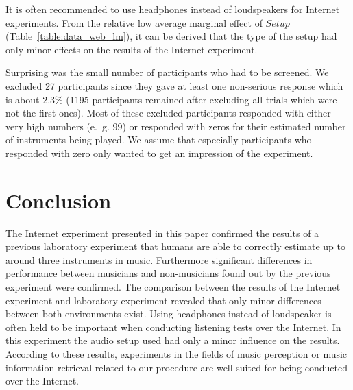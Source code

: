 It is often recommended to use headphones instead of loudspeakers for Internet experiments. From the relative low average marginal effect of $\textit{Setup}$ (Table~\ref{table:data_web_lm}), it can be derived that the type of the setup had only minor effects on the results of the Internet experiment.

Surprising was the small number of participants who had to be screened. We excluded 27 participants since they gave at least one non-serious response which is about 2.3\% (1195 participants remained after excluding all trials which were not the first ones). Most of these excluded participants responded with either very high numbers (e.~g. 99) or responded with zeros for their estimated number of instruments being played. We assume that especially participants who responded with zero only wanted to get an impression of the experiment.



\section{Conclusion}\label{sec:conclusion}
The Internet experiment presented in this paper confirmed the results of a previous laboratory experiment that humans are able to correctly estimate up to around three instruments in music. Furthermore significant differences in performance between musicians and non-musicians found out by the previous experiment were confirmed.
The comparison between the results of the Internet experiment and laboratory experiment revealed that only minor differences between both environments exist. Using headphones instead of loudspeaker is often held to be important when conducting listening tests over the Internet. In this experiment the audio setup used had only a minor influence on the results.
According to these results, experiments in the fields of music perception or music information retrieval related to our procedure are well suited for being conducted over the Internet.
